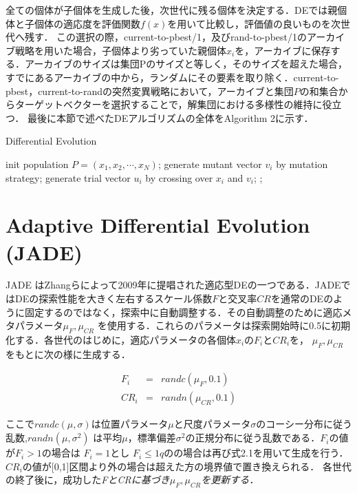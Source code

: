 \documentclass[a4paper,11pt,oneside,openany]{jsbook}
\begin{document}
全ての個体が子個体を生成した後，次世代に残る個体を決定する．DEでは親個体と子個体の適応度を評価関数$f(x)$を用いて比較し，評価値の良いものを次世代へ残す．
この選択の際，current-to-pbest/1，及びrand-to-pbest/1のアーカイブ戦略を用いた場合，子個体より劣っていた親個体$x_{i}$を，アーカイブに保存する．アーカイブのサイズは集団Pのサイズと等しく，そのサイズを超えた場合，すでにあるアーカイブの中から，ランダムにその要素を取り除く．current-to-pbest，current-to-randの突然変異戦略において，アーカイブと集団$P$の和集合からターゲットベクターを選択することで，解集団における多様性の維持に役立つ．
最後に本節で述べたDEアルゴリズムの全体をAlgorithm 2に示す．
\begin{algorithm}
\caption{Differential Evolution}
\label{alg:pbnf}
\begin{algorithmic}
\STATE init population ${P} = (x_1, x_2, \cdots, x_N)$;
        \STATE generate mutant vector {$v_i$} by mutation strategy;
        \STATE generate trial vector {$u_i$} by crossing over {$x_i$} and {$v_i$}; 
    \ENDFOR
            ;
        \ENDIF
    \ENDFOR
\ENDWHILE
\end{algorithmic}
\end{algorithm}


\section{Adaptive Differential Evolution (JADE)}
JADE \cite{JADE}はZhangらによって2009年に提唱された適応型DEの一つである．JADEではDEの探索性能を大きく左右するスケール係数$F$と交叉率$CR$を通常のDEのように固定するのではなく，探索中に自動調整する．その自動調整のために適応メタパラメータ$\mu _F,\mu _{CR}$ を使用する．これらのパラメータは探索開始時に0.5に初期化する．各世代のはじめに，適応パラメータの各個体$x_i$の$F_i$と$CR_i$を，
$\mu _F,\mu _{CR}$をもとに次の様に生成する．

\begin{eqnarray}
  F_i & = & randc(\mu _F, 0.1) \\
  CR_i & = & randn(\mu _{CR}, 0.1)
\end{eqnarray}

ここで$randc(\mu,　\sigma)$は位置パラメータ$\mu$と尺度パラメータ$\sigma$のコーシー分布に従う乱数,$randn(\mu,\sigma^2)$ は平均$\mu$，標準偏差$\sigma^2$の正規分布に従う乱数である．$F_i$の値が$F_i>1$の場合は
$F_i=1$とし $F_i\le1qの$の場合は再び式2.1を用いて生成を行う．$CR_i$の値が[0,1]区間より外の場合は超えた方の境界値で置き換えられる．
各世代の終了後に，成功した\sl{F}と\sl{CR}に基づき$\mu _F, \mu _{CR}$を更新する．
\end{document}
